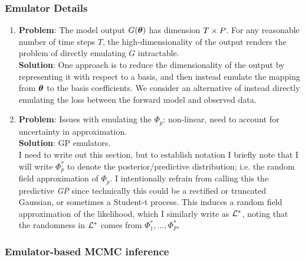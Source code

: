 \documentclass[12pt]{article}
\begin{document}
\subsubsection{Emulator Details}
\begin{enumerate}
\item \textbf{Problem}: The model output $G(\boldsymbol{\theta})$ has dimension $T \times P$. For any reasonable number of time steps $T$, the high-dimensionality of the output renders the problem of directly emulating $G$ intractable.  \\
	\textbf{Solution}: One approach is to reduce the dimensionality of the output by representing it with respect to a basis, and then instead emulate the mapping from $\boldsymbol{\theta}$ to the basis coefficients. We consider an alternative 
	of instead directly emulating the loss between the forward model and observed data. 
	
\item \textbf{Problem}: Issues with emulating the $\Phi_p$: non-linear, need to account for uncertainty in approximation. \\
\textbf{Solution}: GP emulators. \\
I need to write out this section, but to establish notation I briefly note that I will write $\Phi_p^*$ to denote the posterior/predictive distribution; i.e. the random field approximation of $\Phi_p$. I intentionally refrain from calling 
this the predictive \textit{GP} since technically this could be a rectified or truncated Gaussian, or sometimes a Student-t process. This induces a random field approximation of the likelihood, which I similarly write as 
$\mathcal{L}^*$, noting that the randomness in $\mathcal{L}^*$ comes from $\Phi^*_1, \dots, \Phi^*_P$. 
	
\end{enumerate}

\subsubsection{Emulator-based MCMC inference}
\end{document}
